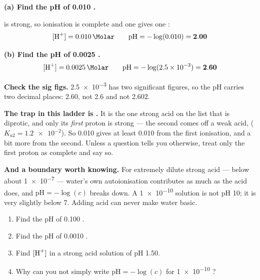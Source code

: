 \documentclass{apchem-worksheet}
\begin{document}
\begin{workedexample}
\textbf{(a) Find the pH of \SI{0.010}{\Molar} .}

 is strong, so ionisation is complete and one  gives one
:
\[ [\ce{H+}] = \SI{0.010}{\Molar}
   \qquad
   \text{pH} = -\log(0.010) = \mathbf{2.00} \]

\textbf{(b) Find the pH of \SI{0.0025}{\Molar} .}
\[ [\ce{H+}] = \SI{0.0025}{\Molar}
   \qquad
   \text{pH} = -\log(\num{2.5e-3}) = \mathbf{2.60} \]

\textbf{Check the sig figs.} \num{2.5e-3} has two significant figures,
so the pH carries two decimal places: 2.60, not 2.6 and not 2.602.

\textbf{The trap in this ladder is .} It is the one strong
acid on the list that is diprotic, and only its \emph{first} proton is
strong --- the second comes off a weak acid, 
($K_{a2} = \num{1.2e-2}$). So \SI{0.010}{\Molar}  gives at
least \SI{0.010}{\Molar}  from the first ionisation, and a bit
more from the second. Unless a question tells you otherwise, treat only
the first proton as complete and say so.

\textbf{And a boundary worth knowing.} For extremely dilute strong acid
--- below about \SI{1e-7}{\Molar} --- water's own autoionisation
contributes as much  as the acid does, and $\text{pH} =
-\log(c)$ breaks down. A \SI{1e-10}{\Molar}  solution is not
pH 10; it is very slightly below 7. Adding acid can never make water
basic.
\end{workedexample}

\begin{yourturn}
\begin{enumerate}[leftmargin=*,itemsep=0.5em]
  \item Find the pH of \SI{0.100}{\Molar} .
        \workspace[1.6cm]
  \item Find the pH of \SI{0.0010}{\Molar} .
        \workspace[1.6cm]
  \item Find $[\ce{H+}]$ in a strong acid solution of pH 1.50.
        \workspace[1.6cm]
  \item Why can you not simply write $\text{pH} = -\log(c)$ for
        \SI{1e-10}{\Molar} ? \workspace[1.8cm]
\end{enumerate}
\end{yourturn}
\end{document}
